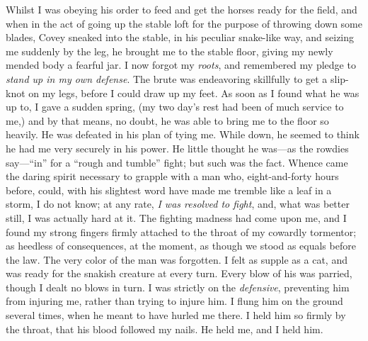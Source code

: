 Whilst I was obeying his order to feed and get the horses ready for the
field, and when in the act of going up the stable loft for the purpose
of throwing down some blades, Covey sneaked into the stable, in his
{\protect\hypertarget{242}{}{}}peculiar snake-like way, and seizing me
suddenly by the leg, he brought me to the stable floor, giving my newly
mended body a fearful jar. I now forgot my \emph{roots}, and remembered
my pledge to \emph{stand up in my own defense}. The brute was
endeavoring skillfully to get a slip-knot on my legs, before I could
draw up my feet. As soon as I found what he was up to, I gave a sudden
spring, (my two day's rest had been of much service to me,) and by that
means, no doubt, he was able to bring me to the floor so heavily. He was
defeated in his plan of tying me. While down, he seemed to think he had
me very securely in his power. He little thought he was---as the rowdies
say---``in'' for a ``rough and tumble'' fight; but such was the fact.
Whence came the daring spirit necessary to grapple with a man who,
eight-and-forty hours before, could, with his slightest word have made
me tremble like a leaf in a storm, I do not know; at any rate, \emph{I
was resolved to fight}, and, what was better still, I was actually hard
at it. The fighting madness had come upon me, and I found my strong
fingers firmly attached to the throat of my cowardly tormentor; as
heedless of consequences, at the moment, as though we stood as equals
before the law. The very color of the man was forgotten. I felt as
supple as a cat, and was ready for the snakish creature at every turn.
Every blow of his was parried, though I dealt no blows in turn. I was
strictly on the \emph{defensive}, preventing him from injuring me,
rather than trying to injure him. I flung him on the ground several
times, when he meant to have hurled me there. I held him
{\protect\hypertarget{243}{}{}}so firmly by the throat, that his blood
followed my nails. He held me, and I held him.

